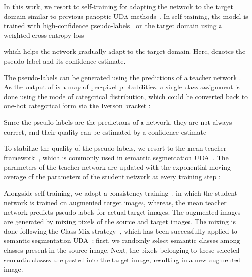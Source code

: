 \documentclass[10pt,twocolumn,letterpaper]{article}
\makeatletter
\renewcommand{\paragraph}{\@startsection{paragraph}{4}{\z@}{1.0ex \@plus 1ex \@minus .2ex}{-1em}{\normalfont\normalsize\bfseries}}
\makeatother
\begin{document}
\paragraph{Self-Training on Target Domain}
In this work, we resort to self-training for adapting the network to the target domain similar to previous panoptic UDA methods~\cite{xu2020cross, zhang2022hierarchical}. In self-training, the model  is trained with high-confidence pseudo-labels~\cite{lee2013pseudo} on the target domain using a weighted cross-entropy loss

which helps the network gradually adapt to the target domain. Here,  denotes the pseudo-label and  its confidence estimate.

The pseudo-labels can be generated using the predictions of a teacher network . 
As the output of  is a map of per-pixel probabilities, a single class assignment is done using the mode of categorical distribution, which could be converted back to one-hot categorical form via the Iverson bracket :

Since the pseudo-labels are the predictions of a network,
they are not always correct, and their quality can be estimated by a confidence estimate ~\cite{zou2018unsupervised,mei2020instance,tranheden2021dacs,hoyer2021improving} 


To stabilize the quality of the pseudo-labels, we resort to the mean teacher framework~\cite{tarvainen2017mean}, which is commonly used in semantic segmentation UDA~\cite{araslanov2021self,tranheden2021dacs,liu2021bapa,hoyer2021daformer}. The parameters of the teacher network  are updated with the exponential moving average of the parameters of the student network  at every training step :


Alongside self-training, we adopt a consistency training~\cite{sajjadi2016regularization, tarvainen2017mean, sohn2020fixmatch},
in which the student network  is trained on augmented target images,
whereas, the mean teacher network  predicts pseudo-labels for actual target images.
The augmented images are generated by mixing pixels of the source and target images.
The mixing is done following the Class-Mix strategy~\cite{olsson2021classmix}, which has been successfully applied to semantic segmentation UDA~\cite{tranheden2021dacs,liu2021bapa,hoyer2021daformer}: first, we randomly select  semantic classes among  classes present in the source image.
Next, the pixels belonging to these selected  semantic classes are pasted into the target image, resulting in a new augmented image.
\end{document}
